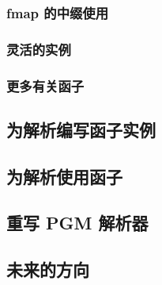 \documentclass[./main.tex]{subfiles}
\begin{document}
\subsubsection*{fmap 的中缀使用}

\subsubsection*{灵活的实例}

\subsubsection*{更多有关函子}

\subsection*{为解析编写函子实例}

\subsection*{为解析使用函子}

\subsection*{重写 PGM 解析器}

\subsection*{未来的方向}
\end{document}
